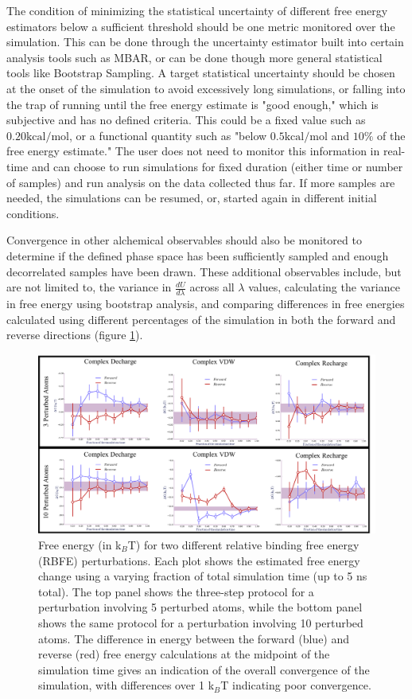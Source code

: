\documentclass[9pt,bestpractices]{livecoms}
\begin{document}
The condition of minimizing the statistical uncertainty of different free energy estimators below a sufficient threshold should be one metric monitored over the simulation. This can be done through the uncertainty estimator built into certain analysis tools such as MBAR, or can be done though more general statistical tools like Bootstrap Sampling. 
A target statistical uncertainty should be chosen at the onset of the simulation to avoid excessively long simulations, or falling into the trap of running until the free energy estimate is "good enough," which is subjective and has no defined criteria. This could be a fixed value such as $0.20 \mathrm{kcal/mol}$, or a functional quantity such as "below $0.5 \mathrm{kcal/mol}$ and $10\%$ of the free energy estimate." The user does not need to monitor this information in real-time and can choose to run simulations for fixed duration (either time or number of samples) and run analysis on the data collected thus far. If more samples are needed, the simulations can be resumed, or, started again in different initial conditions. 

Convergence in other alchemical observables should also be monitored to determine if the defined phase space has been sufficiently sampled and enough decorrelated samples have been drawn. These additional observables include, but are not
limited to, the variance in $\frac{dU}{d\lambda}$ across all $\lambda$ values, calculating the variance in free energy using bootstrap analysis, and comparing differences in free energies calculated using different percentages of the simulation in both the forward and reverse directions (figure \ref{fig:convergence_forward_reverse}).

\begin{figure}
    \centering
    \includegraphics[width=0.95\linewidth]{figures/fig10_forward_reverse/Figure.pdf}
    \caption{Free energy (in k$_{B}$T) for two different relative binding free energy (RBFE) perturbations. 
    Each plot shows the estimated free energy change using a varying fraction of total simulation time (up to 5 ns total). 
    The top panel shows the three-step protocol for a perturbation involving 5 perturbed atoms, while the bottom panel shows the same protocol for a perturbation involving 10 perturbed atoms. The difference in energy between the forward (blue) and reverse (red) free energy calculations at the midpoint of the simulation time gives an indication of the overall convergence of the simulation, with differences over 1 k$_{B}$T indicating poor convergence.}
    \label{fig:convergence_forward_reverse}
\end{figure}
\end{document}
